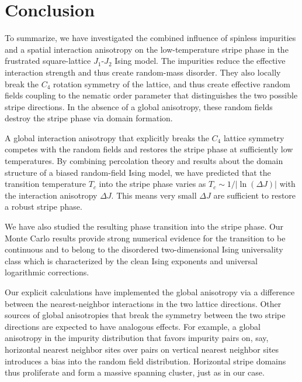 \documentclass[twocolumn,showpacs,superscriptaddress,aps,prb]{revtex4-2}
\begin{document}
\section{Conclusion}
\label{sec:conclusion}

To summarize, we have investigated the combined influence of spinless impurities and a spatial interaction anisotropy
on the low-temperature stripe phase in the frustrated square-lattice $J_1$-$J_2$ Ising model.
The impurities reduce the effective interaction strength and thus create random-mass disorder.
They also locally break the $C_4$ rotation symmetry of the lattice, and thus create effective random fields
coupling to the nematic order parameter that distinguishes the two possible stripe directions.
In the absence of a global anisotropy, these random fields destroy the stripe phase
via domain formation.

A global interaction anisotropy that explicitly breaks the $C_4$ lattice symmetry competes with the random fields
and restores the stripe phase at sufficiently low temperatures. By combining percolation theory and results about the
domain structure of a biased random-field Ising model, we have predicted that the transition temperature $T_c$
into the stripe phase varies as  $T_c \sim 1/|\ln (\Delta J)|$ with the interaction anisotropy $\Delta J$. This means
very small $\Delta J$ are sufficient to restore a robust stripe phase.

We have also studied the resulting phase transition into the stripe phase. Our Monte Carlo results provide strong numerical
evidence for the transition to be continuous and to belong to the disordered two-dimensional Ising universality class
which is characterized by the clean Ising exponents and universal logarithmic corrections.

Our explicit calculations have implemented the global anisotropy via a difference between the
nearest-neighbor interactions in the two lattice directions. Other sources of global anisotropies that
break the symmetry between the two stripe directions are expected to have analogous effects. For example,
a global anisotropy in the impurity distribution that favors impurity pairs on, say, horizontal
nearest neighbor sites over pairs on vertical nearest neighbor sites introduces a bias into
the random field distribution. Horizontal stripe domains thus proliferate and form a massive spanning
cluster, just as in our case.
\end{document}
